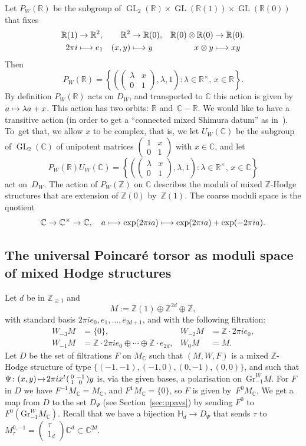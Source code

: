 \documentclass[11pt]{article}
\providecommand{\C}{}
\newcommand{\Subsection}{\subsection}
\def\mto{\mathchoice{\longmapsto}{\mapsto}{\mapsto}{\mapsto}}
\theoremstyle{plain}
\theoremstyle{definition}
\numberwithin{equation}{subsection}
\renewcommand{\C}{\mathbb C}
\newcommand{\R}{\mathbb R}
\newcommand{\Z}{\mathbb Z}
\renewcommand{\H}{\mathbb H}
\newcommand{\Gr}{\mathrm{Gr}}
\DeclareMathOperator{\GL}{GL}
\begin{document}
Let $P_W(\R)$ be the subgroup of
$\GL_2(\R)\times\GL(\R(1))\times\GL(\R(0))$ that fixes
\begin{align*}
\R(1)&\to\R^2,&
\R^2&\to\R(0),&
\R(0)\otimes\R(0)&\to\R(0).\\
2\pi i&\mto e_1&
(x,y)&\mto y&
x\otimes y&\mto xy
\end{align*}
Then
\[
P_W(\R) =
\left\{\left(\begin{pmatrix}\lambda & x\\0&1\end{pmatrix}, \lambda, 1\right)
: \text{$\lambda\in\R^\times$, $x\in\R$}\right\}.
\]
By definition $P_W(\R)$ acts on $D_W$, and transported to $\C$ this
action is given by $a\mto \lambda a+x$. This action has two orbits:
$\R$ and~$\C-\R$. We would like to have a transitive action (in order
to get a ``connected mixed Shimura datum'' as in~\cite[Def.\,2.1]{Pink1}). To~get
that, we allow $x$ to be complex, that is, we let $U_W(\C)$ be the subgroup
of $\GL_2(\C)$ of unipotent matrices
$(\begin{smallmatrix}1 & x\\0&1\end{smallmatrix})$ with $x\in\C$, and
let
\[
P_W(\R)U_W(\C) =
\left\{\left(\begin{pmatrix}\lambda & x\\0&1\end{pmatrix}, \lambda, 1\right)
: \text{$\lambda\in\R^\times$, $x\in\C$}\right\}
\]
act on~$D_W$. The action of $P_W(\Z)$ on $\C$ describes the moduli of
mixed $\Z$-Hodge structures that are extension of $\Z(0)$
by~$\Z(1)$. The coarse moduli space is the quotient
\[
\C\to\C^\times\to \C, \quad
a\mto \exp(2\pi ia)\mto \exp(2\pi ia)+\exp(-2\pi ia).
\]

\Subsection{The universal Poincaré torsor as moduli space of mixed
Hodge structures}
\label{sec:uptams}
Let $d$ be in $\Z_{\geq1}$ and
\[
M:=\Z(1)\oplus\Z^{2d}\oplus\Z,
\]
with
standard basis $2\pi i e_0,e_1,\ldots,e_{2d+1}$, and with the
following filtration:
\[
\begin{aligned}
W_{-3}M & =\{0\},& W_{-2}M&=\Z{\cdot}2\pi ie_0, \\
W_{-1}M & =\Z{\cdot}2\pi ie_0\oplus\cdots\oplus\Z{\cdot}e_{2d},
&W_{0}M&=M.
\end{aligned}
\]
Let $D$ be the set of filtrations $F$ on $M_\C$ such that $(M,W,F)$ is
a mixed $\Z$-Hodge structure of type $\{(-1,-1), (-1,0),(0,-1),
(0,0)\}$, and such that $\Psi\colon (x,y)\!\mto\!2\pi i
x^t(\begin{smallmatrix}0 & -1\\1&0\end{smallmatrix})y$ is, via the
given bases, a polarisation on~$\Gr^W_{-1}M$. For $F$ in $D$ we have
$F^{-1}M_\C=M_\C$, and $F^1M_\C=\{0\}$, so $F$ is given
by~$F^0M_\C$. We get a map from $D$ to the set $D_\Psi$
(see Section~\ref{sec:ppavs}) by sending $F^0$ to
$F^0(\Gr^W_{-1}M_\C)$. Recall that we have a bijection $\H_d\to
D_\Psi$ that sends $\tau$ to $M^{0,-1}_\tau=(\substack{\tau \\
1_d})\C^d\subset\C^{2d}$.
\end{document}
